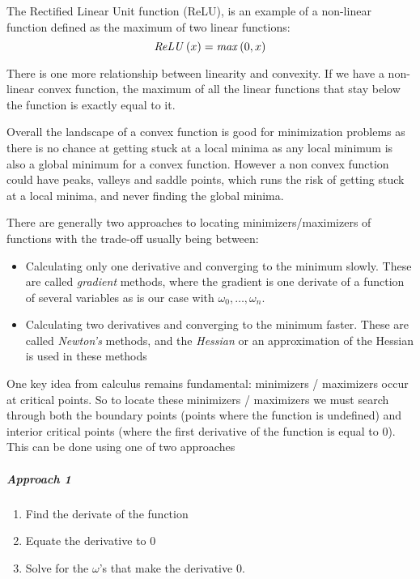 \documentclass[12pt letter]{report}
\begin{document}
The Rectified Linear Unit function (ReLU), is an example of a non-linear function defined as the maximum of two linear
functions:
\[
  \text{\textit{ReLU}} \left( x \right)  = \text{\textit{max}} \left( 0,x \right)
\]

There is one more relationship between linearity and convexity. If we have a non-linear convex function, the maximum of
all the linear functions that stay below the function is exactly equal to it.

Overall the landscape of a convex function is good for minimization problems as there is no chance at getting stuck at a
local minima as any local minimum is also a global minimum for a convex function. However a non convex function could
have peaks, valleys and saddle points, which runs the risk of getting stuck at a local minima, and never finding the
global minima.


There are generally two approaches to locating minimizers/maximizers of functions with the trade-off usually being
between:
\begin{itemize}
  \item Calculating only one derivative and converging to the minimum slowly. These are called \textit{gradient} methods, where
        the gradient is one derivate of a function of several variables as is our case with $\omega_0, \ldots, \omega_n$.
  \item Calculating two derivatives and converging to the minimum faster. These are called \textit{Newton's} methods, and the
        \textit{Hessian} or an approximation of the Hessian is used in these methods
\end{itemize}


One key idea from calculus remains fundamental: minimizers / maximizers occur at critical points. So to locate these
minimizers / maximizers we must search through both the boundary points (points where the function is undefined) and
interior critical points (where the first derivative of the function is equal to 0). This can be done using one of two approaches

\subparagraph{Approach 1}

\begin{enumerate}
  \item Find the derivate of the function
  \item Equate the derivative to 0
  \item Solve for the $\omega$'s that make the derivative 0.
\end{enumerate}
\end{document}
